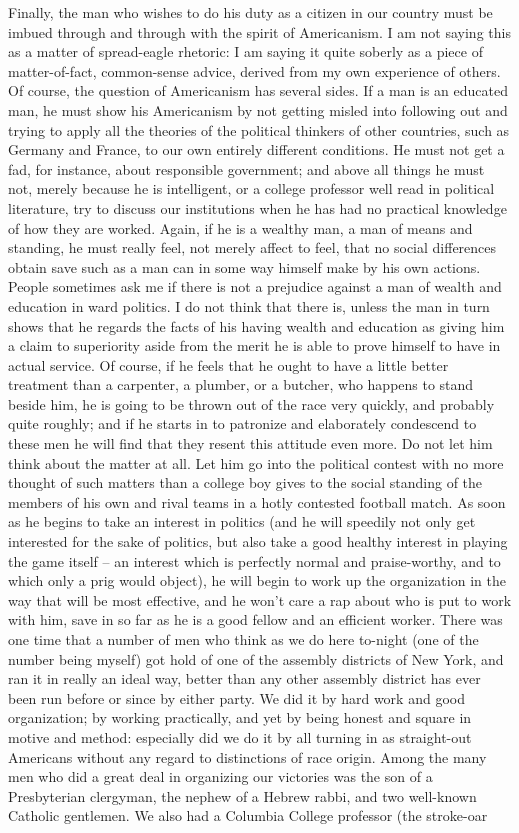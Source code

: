 \documentclass[a4paper]{amsbook}
\begin{document}
Finally, the man who wishes to do his duty as a citizen in our country must be imbued through and through with the spirit of Americanism. I am not saying this as a matter of spread-eagle rhetoric: I am saying it quite soberly as a piece of matter-of-fact, common-sense advice, derived from my own experience of others. Of course, the question of Americanism has several sides. If a man is an educated man, he must show his Americanism by not getting misled into following out and trying to apply all the theories of the political thinkers of other countries, such as Germany and France, to our own entirely different conditions. He must not get a fad, for instance, about responsible government; and above all things he must not, merely because he is intelligent, or a college professor well read in political literature, try to discuss our institutions when he has had no practical knowledge of how they are worked. Again, if he is a wealthy man, a man of means and standing, he must really feel, not merely affect to feel, that no social differences obtain save such as a man can in some way himself make by his own actions. People sometimes ask me if there is not a prejudice against a man of wealth and education in ward politics. I do not think that there is, unless the man in turn shows that he regards the facts of his having wealth and education as giving him a claim to superiority aside from the merit he is able to prove himself to have in actual service. Of course, if he feels that he ought to have a little better treatment than a carpenter, a plumber, or a butcher, who happens to stand beside him, he is going to be thrown out of the race very quickly, and probably quite roughly; and if he starts in to patronize and elaborately condescend to these men he will find that they resent this attitude even more. Do not let him think about the matter at all. Let him go into the political contest with no more thought of such matters than a college boy gives to the social standing of the members of his own and rival teams in a hotly contested football match. As soon as he begins to take an interest in politics (and he will speedily not only get interested for the sake of politics, but also take a good healthy interest in playing the game itself – an interest which is perfectly normal and praise-worthy, and to which only a prig would object), he will begin to work up the organization in the way that will be most effective, and he won't care a rap about who is put to work with him, save in so far as he is a good fellow and an efficient worker. There was one time that a number of men who think as we do here to-night (one of the number being myself) got hold of one of the assembly districts of New York, and ran it in really an ideal way, better than any other assembly district has ever been run before or since by either party. We did it by hard work and good organization; by working practically, and yet by being honest and square in motive and method: especially did we do it by all turning in as straight-out Americans without any regard to distinctions of race origin. Among the many men who did a great deal in organizing our victories was the son of a Presbyterian clergyman, the nephew of a Hebrew rabbi, and two well-known Catholic gentlemen. We also had a Columbia College professor (the stroke-oar 
\end{document}
